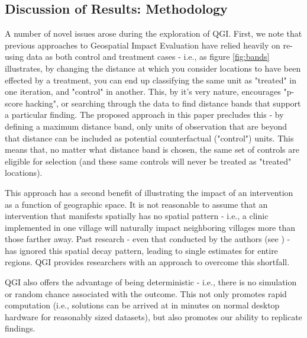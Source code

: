 \documentclass[sustainability,article,submit,moreauthors,pdftex]{Definitions/mdpi}
\begin{document}
\subsection{Discussion of Results: Methodology}
A number of novel issues arose during the exploration of QGI.  First, we note that previous approaches to Geospatial Impact Evaluation have relied heavily on re-using data as both control and treatment cases - i.e., as figure \ref{fig:bands} illustrates, by changing the distance at which you consider locations to have been effected by a treatment, you can end up classifying the same unit as "treated" in one iteration, and "control" in another.  This, by it's very nature, encourages "p-score hacking", or searching through the data to find distance bands that support a particular finding.  The proposed approach in this paper precludes this - by defining a maximum distance band, only units of observation that are beyond that distance can be included as potential counterfactual ("control") units.  This means that, no matter what distance band is chosen, the same set of controls are eligible for selection (and these same controls will never be treated as "treated" locations).
\par
This approach has a second benefit of illustrating the impact of an intervention as a function of geographic space.  It is not reasonable to assume that an intervention that manifests spatially has no spatial pattern - i.e., a clinic implemented in one village will naturally impact neighboring villages more than those farther away.  Past research - even that conducted by the authors (see \cite{MartyTakingMalawi}) - has ignored this spatial decay pattern, leading to single estimates for entire regions.  QGI provides researchers with an approach to overcome this shortfall.
\par
QGI also offers the advantage of being deterministic - i.e., there is no simulation or random chance associated with the outcome.  This not only promotes rapid computation (i.e., solutions can be arrived at in minutes on normal desktop hardware for reasonably sized datasets), but also promotes our ability to replicate findings.  
\end{document}
